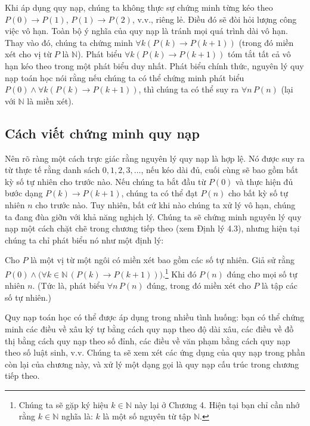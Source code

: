 Khi áp dụng quy nạp, chúng ta không thực sự chứng minh từng kéo theo $P(0) \to P(1)$, $P(1) \to P(2)$, v.v., riêng lẻ. Điều đó sẽ đòi hỏi lượng công việc vô hạn. Toàn bộ ý nghĩa của quy nạp là tránh mọi quá trình dài vô hạn. Thay vào đó, chúng ta chứng minh $\forall k(P(k) \to P(k+1))$ (trong đó miền xét cho vị từ $P$ là $\mathbb{N}$). Phát biểu $\forall k(P(k) \to P(k+1))$ tóm tắt tất cả vô hạn kéo theo trong một phát biểu duy nhất. Phát biểu chính thức, nguyên lý quy nạp toán học nói rằng nếu chúng ta có thể chứng minh phát biểu $P(0) \wedge \forall k(P(k) \to P(k+1))$, thì chúng ta có thể suy ra $\forall n\, P(n)$ (lại với $\mathbb{N}$ là miền xét).

\subsection{Cách viết chứng minh quy nạp}

Nên rõ ràng một cách trực giác rằng nguyên lý quy nạp là hợp lệ. Nó được suy ra từ thực tế rằng danh sách $0, 1, 2, 3, \ldots$, nếu kéo dài đủ, cuối cùng sẽ bao gồm bất kỳ số tự nhiên cho trước nào. Nếu chúng ta bắt đầu từ $P(0)$ và thực hiện đủ bước dạng $P(k) \to P(k+1)$, chúng ta có thể đạt $P(n)$ cho bất kỳ số tự nhiên $n$ cho trước nào. Tuy nhiên, bất cứ khi nào chúng ta xử lý vô hạn, chúng ta đang đùa giỡn với khả năng nghịch lý. Chúng ta sẽ chứng minh nguyên lý quy nạp một cách chặt chẽ trong chương tiếp theo (xem Định lý 4.3), nhưng hiện tại chúng ta chỉ phát biểu nó như một định lý:

\begin{theorem}
Cho $P$ là một vị từ một ngôi có miền xét bao gồm các số tự nhiên. Giả sử rằng $P(0) \wedge \big(\forall k \in \mathbb{N}\, (P(k) \to P(k+1))\big)$.\footnote{Chúng ta sẽ gặp ký hiệu $k \in \mathbb{N}$ này lại ở Chương 4. Hiện tại bạn chỉ cần nhớ rằng $k \in \mathbb{N}$ nghĩa là: $k$ là một số nguyên từ tập $\mathbb{N}$.} Khi đó $P(n)$ đúng cho mọi số tự nhiên $n$. (Tức là, phát biểu $\forall n\, P(n)$ đúng, trong đó miền xét cho $P$ là tập các số tự nhiên.)
\end{theorem}

Quy nạp toán học có thể được áp dụng trong nhiều tình huống: bạn có thể chứng minh các điều về xâu ký tự bằng cách quy nạp theo độ dài xâu, các điều về đồ thị bằng cách quy nạp theo số đỉnh, các điều về văn phạm bằng cách quy nạp theo số luật sinh, v.v. Chúng ta sẽ xem xét các ứng dụng của quy nạp trong phần còn lại của chương này, và xử lý một dạng gọi là quy nạp cấu trúc trong chương tiếp theo.

